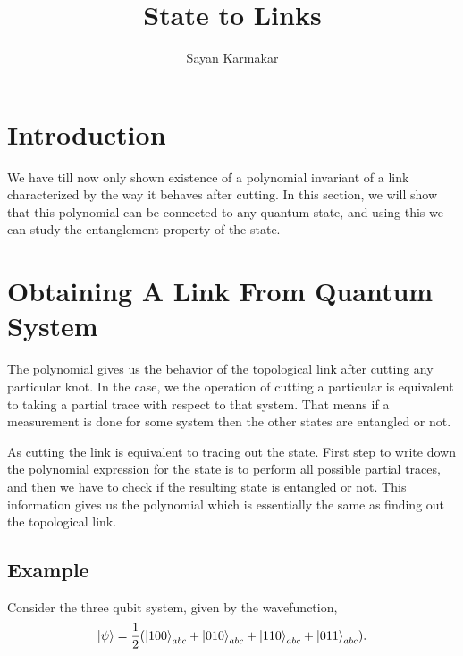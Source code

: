 \documentclass{amsart}
\theoremstyle{plain}
\theoremstyle{definition}
\theoremstyle{plain}
\begin{document}
	\title{State to Links}
	\author{Sayan Karmakar }
	\address{Department of Physics, IISERK}
	\maketitle
	
	
	\section{Introduction}
	We have till now only shown existence of a polynomial invariant of a link characterized by the way it behaves after cutting. In this section, we will show that this polynomial can be connected to any quantum state, and using this we can study the entanglement property of the state.
	 
	 
	\section{Obtaining A Link From Quantum System} 
	The polynomial gives us the behavior of the topological link after cutting any particular knot. In the case, we the operation of cutting a particular is equivalent to taking a partial trace with respect to that system. That means if a measurement is done for some system then the other states are entangled or not. 
	
	As cutting the link is equivalent to tracing out the state. First step to write down the polynomial expression for the state is to perform all possible partial traces, and then we have to check if the resulting state is entangled or not. This information gives us the polynomial which is essentially the same as finding out the topological link.
	
	\subsection{Example}
	
	Consider the three qubit system, given by the wavefunction, 
	 \begin{equation*}
	 	\ket{\psi} = \frac{1}{2} (\ket{100}_{abc} + \ket{010}_{abc} + \ket{110}_{abc}+ \ket{011}_{abc}).
	 \end{equation*}
 
\end{document}
